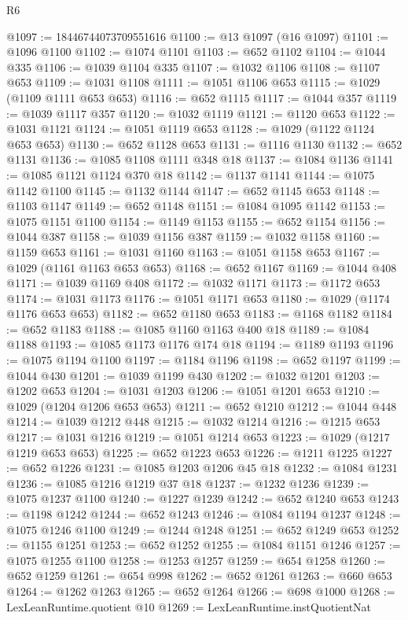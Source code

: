 \begin{lexlean}{R6}
\begin{coremodule}
@1097 := 18446744073709551616
@1100 := @13 @1097 (@16 @1097)
@1101 := @1096 @1100
@1102 := @1074 @1101
@1103 := @652 @1102
@1104 := @1044 @335
@1106 := @1039 @1104 @335
@1107 := @1032 @1106
@1108 := @1107 @653
@1109 := @1031 @1108
@1111 := @1051 @1106 @653
@1115 := @1029 (@1109 @1111 @653 @653)
@1116 := @652 @1115
@1117 := @1044 @357
@1119 := @1039 @1117 @357
@1120 := @1032 @1119
@1121 := @1120 @653
@1122 := @1031 @1121
@1124 := @1051 @1119 @653
@1128 := @1029 (@1122 @1124 @653 @653)
@1130 := @652 @1128 @653
@1131 := @1116 @1130
@1132 := @652 @1131
@1136 := @1085 @1108 @1111 @348 @18
@1137 := @1084 @1136
@1141 := @1085 @1121 @1124 @370 @18
@1142 := @1137 @1141
@1144 := @1075 @1142 @1100
@1145 := @1132 @1144
@1147 := @652 @1145 @653
@1148 := @1103 @1147
@1149 := @652 @1148
@1151 := @1084 @1095 @1142
@1153 := @1075 @1151 @1100
@1154 := @1149 @1153
@1155 := @652 @1154
@1156 := @1044 @387
@1158 := @1039 @1156 @387
@1159 := @1032 @1158
@1160 := @1159 @653
@1161 := @1031 @1160
@1163 := @1051 @1158 @653
@1167 := @1029 (@1161 @1163 @653 @653)
@1168 := @652 @1167
@1169 := @1044 @408
@1171 := @1039 @1169 @408
@1172 := @1032 @1171
@1173 := @1172 @653
@1174 := @1031 @1173
@1176 := @1051 @1171 @653
@1180 := @1029 (@1174 @1176 @653 @653)
@1182 := @652 @1180 @653
@1183 := @1168 @1182
@1184 := @652 @1183
@1188 := @1085 @1160 @1163 @400 @18
@1189 := @1084 @1188
@1193 := @1085 @1173 @1176 @174 @18
@1194 := @1189 @1193
@1196 := @1075 @1194 @1100
@1197 := @1184 @1196
@1198 := @652 @1197
@1199 := @1044 @430
@1201 := @1039 @1199 @430
@1202 := @1032 @1201
@1203 := @1202 @653
@1204 := @1031 @1203
@1206 := @1051 @1201 @653
@1210 := @1029 (@1204 @1206 @653 @653)
@1211 := @652 @1210
@1212 := @1044 @448
@1214 := @1039 @1212 @448
@1215 := @1032 @1214
@1216 := @1215 @653
@1217 := @1031 @1216
@1219 := @1051 @1214 @653
@1223 := @1029 (@1217 @1219 @653 @653)
@1225 := @652 @1223 @653
@1226 := @1211 @1225
@1227 := @652 @1226
@1231 := @1085 @1203 @1206 @45 @18
@1232 := @1084 @1231
@1236 := @1085 @1216 @1219 @37 @18
@1237 := @1232 @1236
@1239 := @1075 @1237 @1100
@1240 := @1227 @1239
@1242 := @652 @1240 @653
@1243 := @1198 @1242
@1244 := @652 @1243
@1246 := @1084 @1194 @1237
@1248 := @1075 @1246 @1100
@1249 := @1244 @1248
@1251 := @652 @1249 @653
@1252 := @1155 @1251
@1253 := @652 @1252
@1255 := @1084 @1151 @1246
@1257 := @1075 @1255 @1100
@1258 := @1253 @1257
@1259 := @654 @1258
@1260 := @652 @1259
@1261 := @654 @998
@1262 := @652 @1261
@1263 := @660 @653
@1264 := @1262 @1263
@1265 := @652 @1264
@1266 := @698 @1000
@1268 := LexLeanRuntime.quotient @10
@1269 := LexLeanRuntime.instQuotientNat

\end{coremodule}
\end{lexlean}
